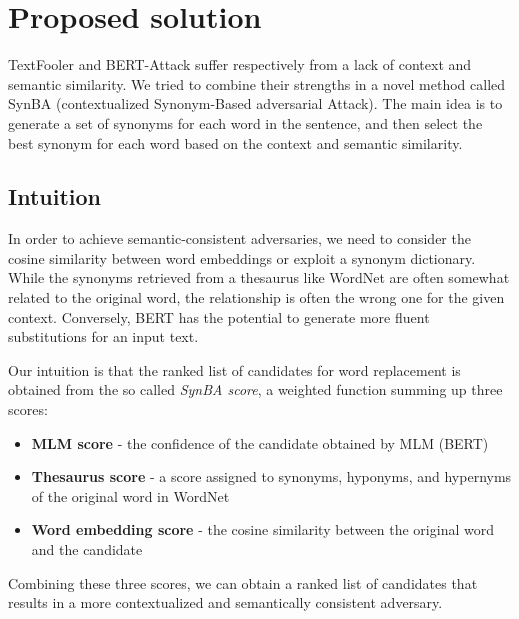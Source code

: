 \section{Proposed solution}\label{sec:proposed-solution}

TextFooler and BERT-Attack suffer respectively from a lack of context and semantic similarity. 
We tried to combine their strengths in a novel method called SynBA (contextualized Synonym-Based adversarial Attack).
The main idea is to generate a set of synonyms for each word in the sentence, and then select the best synonym for each word based on the context and semantic similarity.


\subsection{Intuition}\label{subsec:intuition}

In order to achieve semantic-consistent adversaries, we need to consider the cosine similarity between word embeddings or exploit a synonym dictionary.
While the synonyms retrieved from a thesaurus like WordNet are often somewhat related to the original word, the relationship is often the wrong one for the given context.
Conversely, BERT has the potential to generate more fluent substitutions for an input text.

Our intuition is that the ranked list of candidates for word replacement is obtained from the so called \emph{SynBA score}, a weighted function summing up three scores:
\begin{itemize}
    \item \textbf{MLM score} - the confidence of the candidate obtained by MLM (BERT)
    \item \textbf{Thesaurus score} - a score assigned to synonyms, hyponyms, and hypernyms of the original word in WordNet
    \item \textbf{Word embedding score} - the cosine similarity between the original word and the candidate
\end{itemize}

Combining these three scores, we can obtain a ranked list of candidates that results in a more contextualized and semantically consistent adversary.


